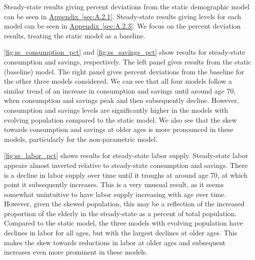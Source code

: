 \documentclass[10pt]{article}
\newcommand{\aref}[1]{\hyperref[#1]{Appendix~\ref{#1}}}
\numberwithin{equation}{subsection}
\begin{document}
\par Steady-state results giving percent deviations from the static demographic model can be seen in \aref{sec:A.2.1}. Steady-state results giving levels for each model can be seen in \aref{sec:A.2.3}. We focus on the percent deviation results, treating the static model as a baseline.

\par \autoref{fig:ss_consumption_pct} and \autoref{fig:ss_savings_pct} show results for steady-state consumption and savings, respectively. The left panel gives results from the static (baseline) model. The right panel gives percent deviations from the baseline for the other three models considered. We can see that all four models follow a similar trend of an increase in consumption and savings until around age 70, when consumption and savings peak and then subsequently decline. However, consumption and savings levels are significantly higher in the models with evolving population compared to the static model. We also see that the skew towards consumption and savings at older ages is more pronounced in these models, particularly for the non-parametric model.

\par \autoref{fig:ss_labor_pct} shows results for steady-state labor supply. Steady-state labor appears almost inverted relative to steady-state consumption and savings. There is a decline in labor supply over time until it troughs at around age 70, at which point it subsequently increases. This is a very unusual result, as it seems somewhat unintuitive to have labor supply increasing with age over time. However, given the skewed population, this may be a reflection of the increased proportion of the elderly in the steady-state as a percent of total population. Compared to the static model, the three models with evolving population have declines in labor for all ages, but with the largest declines at older ages. This makes the skew towards reductions in labor at older ages and subsequent increases even more prominent in these models.

\end{document}
